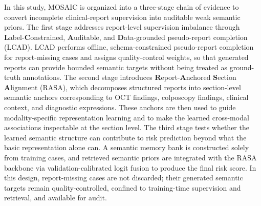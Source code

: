 \documentclass[11pt, a4paper]{article}
\theoremstyle{plain}
\theoremstyle{definition}
\begin{document}
In this study, MOSAIC is organized into a three-stage chain of evidence to convert incomplete clinical-report supervision into auditable weak semantic priors. The first stage addresses report-level supervision imbalance through \textbf{L}abel-\textbf{C}onstrained, \textbf{A}uditable, and \textbf{D}ata-grounded pseudo-report completion (LCAD). LCAD performs offline, schema-constrained pseudo-report completion for report-missing cases and assigns quality-control weights, so that generated reports can provide bounded semantic targets without being treated as ground-truth annotations. The second stage introduces \textbf{R}eport-\textbf{A}nchored \textbf{S}ection \textbf{A}lignment (RASA), which decomposes structured reports into section-level semantic anchors corresponding to OCT findings, colposcopy findings, clinical context, and diagnostic expressions. These anchors are then used to guide modality-specific representation learning and to make the learned cross-modal associations inspectable at the section level. The third stage tests whether the learned semantic structure can contribute to risk prediction beyond what the basic representation alone can. A semantic memory bank is constructed solely from training cases, and retrieved semantic priors are integrated with the RASA backbone via validation-calibrated logit fusion to produce the final risk score. In this design, report-missing cases are not discarded; their generated semantic targets remain quality-controlled, confined to training-time supervision and retrieval, and available for audit.

\end{document}
